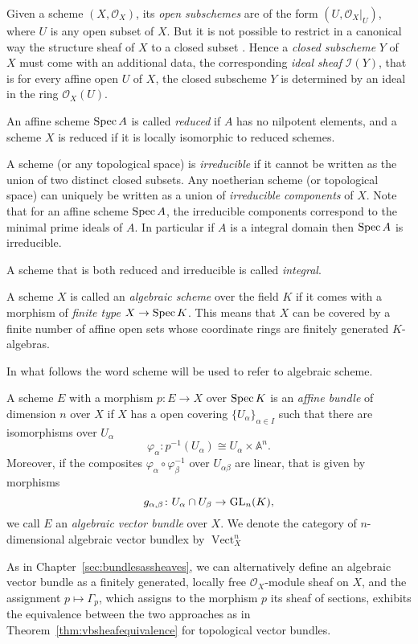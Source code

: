 \documentclass[a4paper,openany]{scrbook}
\DeclareMathOperator{\Vect}{Vect}
\newcommand{\Reg}[1]{\mathcal O_{#1}}
\begin{document}
Given a scheme $(X,\mathcal O_X)$, its \emph{open subschemes} are of the form $(U,\mathcal O_X|_U)$, where $U$ is any open subset of $X$. But it is not possible to restrict in a canonical way the structure sheaf of $X$ to a closed subset . Hence a \emph{closed subscheme} $Y$ of $X$ must come with an additional data, the corresponding \emph{ideal sheaf} $\mathcal I(Y)$, that is for every affine open $U$ of $X$, the closed subscheme $Y$ is determined by an ideal in the ring $\mathcal O_X(U)$.

An affine scheme $\operatorname{Spec} A$ is called \emph{reduced} if $A$ has no nilpotent elements, and a scheme $X$ is reduced if it is locally isomorphic to reduced schemes.

A scheme (or any topological space) is \emph{irreducible} if it cannot be written as the union of two distinct closed subsets. Any noetherian scheme (or topological space) can uniquely be written as a union of \emph{irreducible components} of $X$. Note that for an affine scheme $\operatorname{Spec} A$, the irreducible components correspond to the minimal prime ideals of $A$. In particular if $A$ is a integral domain then $\operatorname{Spec} A$ is irreducible.

A scheme that is both reduced and irreducible is called \emph{integral}.

A scheme $X$ is called an \emph{algebraic scheme} over the field $K$ if it comes with a morphism of \emph{finite type} $X \to \operatorname{Spec} K$. This means that $X$ can be covered by a finite number of affine open sets whose coordinate rings are finitely generated $K$-algebras.

In what follows the word scheme will be used to refer to algebraic scheme.

\begin{defn}
 A scheme $E$ with a morphism $p\colon E\to X$ over $\operatorname{Spec} K$ is an \emph{affine bundle} of dimension $n$ over $X$ if $X$ has a open covering $\{U_\alpha\}_{\alpha \in I}$ such that there are isomorphisms over $U_\alpha$
 \[\varphi_\alpha\colon p^{-1}(U_\alpha) \cong U_\alpha\times \mathbb A^n.\]
 Moreover, if  the composites $\varphi_\alpha\circ \varphi_\beta^{-1}$ over $U_{\alpha\beta}$ are linear, that is given by morphisms
 \[
 g_{\alpha,\beta}\colon U_\alpha\cap U_\beta\to \operatorname{GL}_n(K),
 \]
 we call $E$ an \emph{algebraic vector bundle} over $X$. We denote the category of $n$-dimensional algebraic vector bundlex by $\Vect^n_X$
\end{defn}

As in Chapter~\ref{sec:bundlesassheaves}, we can alternatively define an algebraic vector bundle as a finitely generated, locally free $\Reg{X}$-module sheaf on $X$, and the assignment $p \mapsto \Gamma_p$, which assigns to the morphism $p$ its sheaf of sections, exhibits the equivalence between the two approaches as in Theorem~\ref{thm:vbsheafequivalence} for topological vector bundles. 
\end{document}
